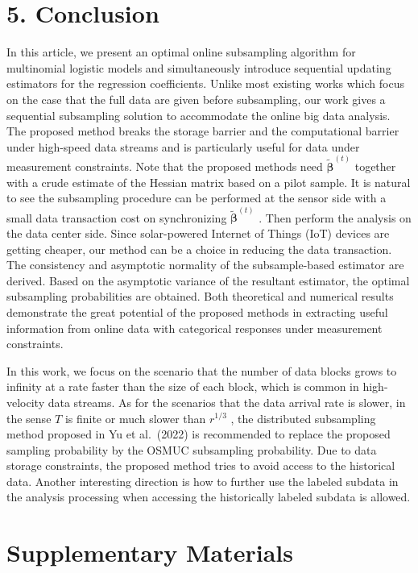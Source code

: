 \documentclass[
  10
]{article}
\begin{document}
\section{5. Conclusion}\label{conclusion}

In this article, we present an optimal online subsampling algorithm for
multinomial logistic models and simultaneously introduce sequential
updating estimators for the regression coefficients. Unlike most
existing works which focus on the case that the full data are given
before subsampling, our work gives a sequential subsampling solution to
accommodate the online big data analysis. The proposed method breaks the
storage barrier and the computational barrier under high-speed data
streams and is particularly useful for data under measurement
constraints. Note that the proposed methods need
\(\tilde { \boldsymbol { \beta } } ^ { ( t ) }\) together with a crude
estimate of the Hessian matrix based on a pilot sample. It is natural to
see the subsampling procedure can be performed at the sensor side with a
small data transaction cost on synchronizing
\(\tilde { \boldsymbol { \beta } } ^ { ( t ) }\) . Then perform the
analysis on the data center side. Since solar-powered Internet of Things
(IoT) devices are getting cheaper, our method can be a choice in
reducing the data transaction. The consistency and asymptotic normality
of the subsample-based estimator are derived. Based on the asymptotic
variance of the resultant estimator, the optimal subsampling
probabilities are obtained. Both theoretical and numerical results
demonstrate the great potential of the proposed methods in extracting
useful information from online data with categorical responses under
measurement constraints.

In this work, we focus on the scenario that the number of data blocks
grows to infinity at a rate faster than the size of each block, which is
common in high-velocity data streams. As for the scenarios that the data
arrival rate is slower, in the sense \(T\) is finite or much slower than
\(r ^ { 1 / 3 }\) , the distributed subsampling method proposed in Yu et
al.~(2022) is recommended to replace the proposed sampling probability
by the OSMUC subsampling probability. Due to data storage constraints,
the proposed method tries to avoid access to the historical data.
Another interesting direction is how to further use the labeled subdata
in the analysis processing when accessing the historically labeled
subdata is allowed.

\section{Supplementary Materials}\label{supplementary-materials}
\end{document}
